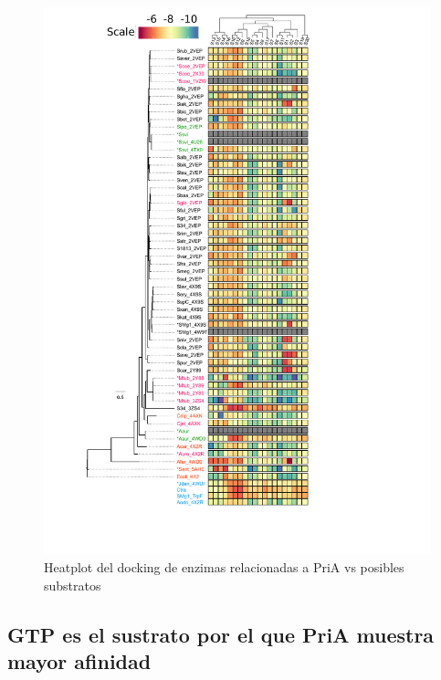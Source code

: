 \documentclass[12pt,twoside]{reedthesis}
\begin{document}
{  \begin{figure}[h!tbp]
  \centering
  \includegraphics[angle = 0,scale = .7]{chapter4/Figura1_4.pdf}
  \caption[Heatplot del docking de enzimas relacionadas a PriA vs posibles substratos]{\footnotesize{Heatplot del docking de enzimas relacionadas a PriA vs posibles substratos}}
  \label{fig:HeatplodPriAdocking}
  \end{figure}
  
  \subsection{GTP es el sustrato por el que PriA muestra mayor
  afinidad}\label{gtp-es-el-sustrato-por-el-que-pria-muestra-mayor-afinidad}
  
}
\end{document}
